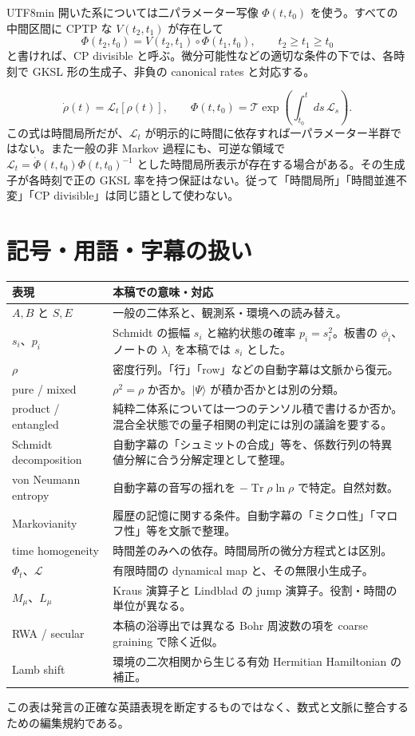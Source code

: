 \documentclass[11pt,a4paper]{article}
\numberwithin{equation}{section}
\newcommand{\Tr}{\operatorname{Tr}}
\newcommand{\ket}[1]{\lvert#1\rangle}
\begin{document}
\begin{CJK*}{UTF8}{min}
開いた系については二パラメーター写像 $\Phi(t,t_0)$ を使う。すべての中間区間に CPTP な $V(t_2,t_1)$ が存在して
\begin{equation}
\Phi(t_2,t_0)=V(t_2,t_1)\circ\Phi(t_1,t_0),
\qquad t_2\geq t_1\geq t_0
\end{equation}
と書ければ、CP divisible と呼ぶ。微分可能性などの適切な条件の下では、各時刻で GKSL 形の生成子、非負の canonical rates と対応する。

\begin{equation}
\dot\rho(t)=\mathcal L_t[\rho(t)],
\qquad \Phi(t,t_0)=\mathcal T\exp\!\left(\int_{t_0}^{t}ds\,\mathcal L_s\right).
\end{equation}
この式は時間局所だが、$\mathcal L_t$ が明示的に時間に依存すれば一パラメーター半群ではない。また一般の非 Markov 過程にも、可逆な領域で $\mathcal L_t=\dot\Phi(t,t_0)\Phi(t,t_0)^{-1}$ とした時間局所表示が存在する場合がある。その生成子が各時刻で正の GKSL 率を持つ保証はない。従って「時間局所」「時間並進不変」「CP divisible」は同じ語として使わない。

\section{記号・用語・字幕の扱い}
\label{app:terminology}
\begin{longtable}{p{}p{}}
\toprule
表現 & 本稿での意味・対応\\\midrule\endhead
$A,B$ と $S,E$ & 一般の二体系と、観測系・環境への読み替え。\\
$s_i$、$p_i$ & Schmidt の振幅 $s_i$ と縮約状態の確率 $p_i=s_i^2$。板書の $\phi_i$、ノートの $\lambda_i$ を本稿では $s_i$ とした。\\
$\rho$ & 密度行列。「行」「row」などの自動字幕は文脈から復元。\\
pure / mixed & $\rho^2=\rho$ か否か。$\ket{\Psi}$ が積か否かとは別の分類。\\
product / entangled & 純粋二体系については一つのテンソル積で書けるか否か。混合全状態での量子相関の判定には別の議論を要する。\\
Schmidt decomposition & 自動字幕の「シュミットの合成」等を、係数行列の特異値分解に合う分解定理として整理。\\
von Neumann entropy & 自動字幕の音写の揺れを $-\Tr\rho\ln\rho$ で特定。自然対数。\\
Markovianity & 履歴の記憶に関する条件。自動字幕の「ミクロ性」「マロフ性」等を文脈で整理。\\
time homogeneity & 時間差のみへの依存。時間局所の微分方程式とは区別。\\
$\Phi_t$、$\mathcal L$ & 有限時間の dynamical map と、その無限小生成子。\\
$M_\mu$、$L_\mu$ & Kraus 演算子と Lindblad の jump 演算子。役割・時間の単位が異なる。\\
RWA / secular & 本稿の浴導出では異なる Bohr 周波数の項を coarse graining で除く近似。\\
Lamb shift & 環境の二次相関から生じる有効 Hermitian Hamiltonian の補正。\\\bottomrule
\end{longtable}
この表は発言の正確な英語表現を断定するものではなく、数式と文脈に整合するための編集規約である。


\end{CJK*}
\end{document}

